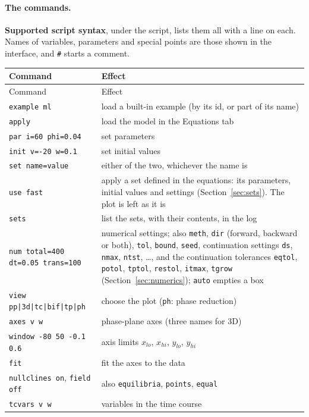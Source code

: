 \documentclass[11pt,a4paper]{article}
\newcommand{\ui}[1]{\textsf{\textbf{#1}}}          %
\begin{document}
\paragraph{The commands.} \ui{Supported script syntax}, under the script, lists them all with a line on each. Names of variables, parameters and special points are those shown in the interface, and \texttt{\#} starts a comment.
{\small
\begin{longtable}{@{}p{}p{}@{}}
\toprule
Command & Effect\\
\midrule
\endfirsthead
\toprule
Command & Effect\\
\midrule
\endhead
\bottomrule
\endfoot
\texttt{example ml} & load a built-in example (by its id, or part of its name)\\
\texttt{apply} & load the model in the Equations tab\\
\texttt{par i=60 phi=0.04} & set parameters\\
\texttt{init v=-20 w=0.1} & set initial values\\
\texttt{set name=value} & either of the two, whichever the name is\\
\texttt{use fast} & apply a set defined in the equations: its parameters, initial values and settings (Section~\ref{sec:sets}). The plot is left as it is\\
\texttt{sets} & list the sets, with their contents, in the log\\
\texttt{num total=400 dt=0.05 trans=100} & numerical settings; also \texttt{meth}, \texttt{dir} (forward, backward or both), \texttt{tol}, \texttt{bound}, \texttt{seed}, continuation settings \texttt{ds}, \texttt{nmax}, \texttt{ntst}, \ldots, and the continuation tolerances \texttt{eqtol}, \texttt{potol}, \texttt{tptol}, \texttt{restol}, \texttt{itmax}, \texttt{tgrow} (Section~\ref{sec:numerics}); \texttt{auto} empties a box\\
\midrule
\texttt{view pp|3d|tc|bif|tp|ph} & choose the plot (\texttt{ph}: phase reduction)\\
\texttt{axes v w} & phase-plane axes (three names for 3D)\\
\texttt{window -80 50 -0.1 0.6} & axis limits $x_{lo}$, $x_{hi}$, $y_{lo}$, $y_{hi}$\\
\texttt{fit} & fit the axes to the data\\
\texttt{nullclines on}, \texttt{field off} & also \texttt{equilibria}, \texttt{points}, \texttt{equal}\\
\texttt{tcvars v w} & variables in the time course\\

\end{longtable}}
\end{document}
